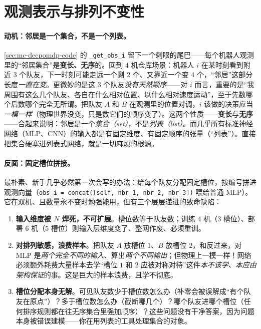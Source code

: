 \section{观测表示与排列不变性}
\label{sec:mc-perminv}

\paragraph{动机：邻居是一个集合，不是一个列表。}
\cref{sec:mc-decpomdp-code} 的 \verb|_get_obs_i| 留下一个刺眼的尾巴——每个机器人观测里的“邻居集合”是\textbf{变长、无序}的。回到 $4$ 机仓库场景：机器人 $i$ 在某时刻看到附近 $3$ 个队友，下一时刻可能走远一个剩 $2$ 个、又靠近一个变 $4$ 个，“邻居”这部分长度\emph{一直在变}。更微妙的是这 $3$ 个队友\emph{没有天然顺序}——对 $i$ 而言，重要的是“我周围有这么几个队友、各自在什么相对位置、以什么相对速度运动”，至于先数哪个后数哪个完全无所谓。把队友 $A$ 和 $B$ 在观测里的位置对调，$i$ 该做的决策应当\emph{一模一样}（物理世界没变，只是数它们的顺序变了）。这两个性质——\textbf{变长}与\textbf{无序}——合起来说明：邻居是一个\emph{集合（set）}，不是\emph{列表（list）}。而几乎所有标准神经网络（MLP、CNN）的输入都是有固定维度、有固定顺序的张量（“列表”）。直接把集合硬塞进列表式网络，就是一切麻烦的根源。

\paragraph{反面：固定槽位拼接。}
最朴素、新手几乎必然第一次会写的办法：给每个队友分配固定槽位，按编号拼进观测向量（\verb|obs_i = concat([self, nbr_1, nbr_2, nbr_3])| 喂给普通 MLP）。它在双机、且数量永不变时勉强能用，但有三个层层递进的致命缺陷：

\begin{enumerate}
  \item \textbf{输入维度被 $N$ 焊死，不可扩展}。槽位数等于队友数；训练 $4$ 机（$3$ 槽位）、部署 $6$ 机（$5$ 槽位）则输入层维度变了、整网作废、必须重训。
  \item \textbf{对排列敏感，浪费样本}。把队友 $A$ 放槽位 $1$、$B$ 放槽位 $2$，和反过来，对 MLP 是\emph{两个完全不同的输入}、算出\emph{两个不同输出}；但物理上一模一样！网络必须额外耗费大量样本去学“槽位 $1$ 和 $2$ 应被对称对待”这件\emph{本不该学、本应由架构保证}的事。这是巨大的样本浪费，且学不彻底。
  \item \textbf{槽位分配本身无解}。可见队友数少于槽位数怎么办（补零会被误解成“有个队友在原点”）？多于槽位数怎么办（截断哪几个）？哪个队友进哪个槽位（任何排序规则都在往无序集合里强加顺序）？这些问题没有干净答案，因为问题本身被错误建模——你在用列表的工具处理集合的对象。
\end{enumerate}

